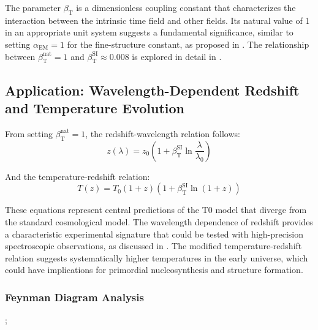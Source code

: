 \documentclass[12pt,a4paper]{article}
\newcommand{\alphaEM}{\alpha_{\text{EM}}}
\newcommand{\betaT}{\beta_{\text{T}}}
\begin{document}
	The parameter \(\betaT\) is a dimensionless coupling constant that characterizes the interaction between the intrinsic time field and other fields. Its natural value of 1 in an appropriate unit system suggests a fundamental significance, similar to setting \(\alphaEM = 1\) for the fine-structure constant, as proposed in \cite{pascher_alpha_2025}. The relationship between \(\betaT^{\text{nat}} = 1\) and \(\betaT^{\text{SI}} \approx 0.008\) is explored in detail in \cite{pascher_alphabeta_2025}.
	
	\subsection{Application: Wavelength-Dependent Redshift and Temperature Evolution}
	\label{subsec:wavelength_redshift}
	
	From setting \(\betaT^{\text{nat}} = 1\), the redshift-wavelength relation follows:
	\begin{equation}
		z(\lambda) = z_0 \left(1 + \betaT^{\text{SI}} \ln \frac{\lambda}{\lambda_0}\right)
	\end{equation}
	
	And the temperature-redshift relation:
	\begin{equation}
		T(z) = T_0 (1 + z) (1 + \betaT^{\text{SI}} \ln(1 + z))
	\end{equation}
	
	These equations represent central predictions of the T0 model that diverge from the standard cosmological model. The wavelength dependence of redshift provides a characteristic experimental signature that could be tested with high-precision spectroscopic observations, as discussed in \cite{pascher_messdifferenzen_2025}. The modified temperature-redshift relation suggests systematically higher temperatures in the early universe, which could have implications for primordial nucleosynthesis and structure formation.
	
	\subsubsection{Feynman Diagram Analysis}
	\label{subsubsec:feynman_diagram}
	
	\begin{center}
		;
	\end{center}
	
\end{document}
